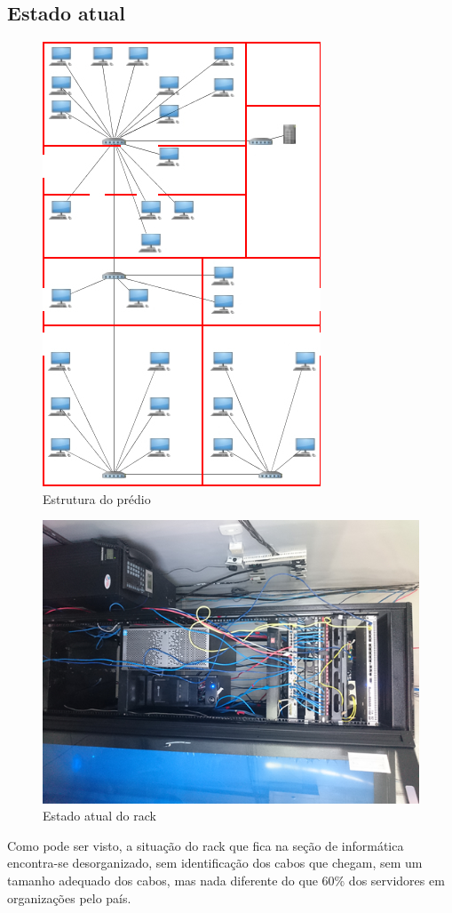 \documentclass[12pt, a4paper]{article}
\begin{document}
	\subsection{Estado atual}
	\FloatBarrier
	\begin{figure}[!htp]
		\centering
		\includegraphics[scale=0.9]{unnamed0.jpg}
		\caption{Estrutura do prédio}
	\end{figure}
	\FloatBarrier
	\FloatBarrier
	\begin{figure}[!htp]
		\centering
		\includegraphics[scale=0.9]{atual_rack.png}
		\caption{Estado atual do rack}
	\end{figure}
	\FloatBarrier
	Como pode ser visto, a situação do rack que fica na seção de informática encontra-se desorganizado, sem identificação dos cabos que chegam, sem um tamanho adequado dos cabos, mas nada diferente do que 60\% dos servidores em organizações pelo país.
\end{document}
